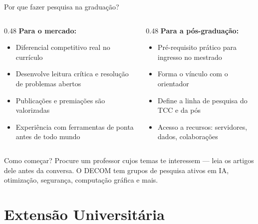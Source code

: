 \documentclass[aspectratio=169]{beamer}
\begin{document}
\begin{frame}{Por que fazer pesquisa na graduação?}
  \begin{columns}[T]
    \begin{column}{0.48\textwidth}
      \textbf{Para o mercado:}
      \begin{itemize}\setlength\itemsep{4pt}
        \item Diferencial competitivo real no currículo
        \item Desenvolve leitura crítica e resolução de problemas abertos
        \item Publicações e premiações são valorizadas
        \item Experiência com ferramentas de ponta antes de todo mundo
      \end{itemize}
    \end{column}
    \begin{column}{0.48\textwidth}
      \textbf{Para a pós-graduação:}
      \begin{itemize}\setlength\itemsep{4pt}
        \item Pré-requisito prático para ingresso no mestrado
        \item Forma o vínculo com o orientador
        \item Define a linha de pesquisa do TCC e da pós
        \item Acesso a recursos: servidores, dados, colaborações
      \end{itemize}
    \end{column}
  \end{columns}
  \pause
  \vspace{0.3cm}
  \begin{alertblock}{Como começar?}
    Procure um professor cujos temas te interessem --- leia os artigos dele antes da conversa. O DECOM tem grupos de pesquisa ativos em IA, otimização, segurança, computação gráfica e mais.
  \end{alertblock}
\end{frame}

\section{Extensão Universitária}
\end{document}
